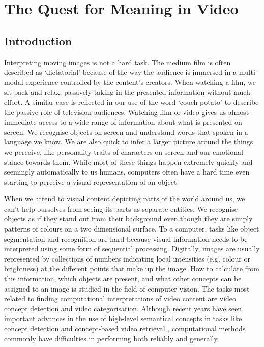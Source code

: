 \chapter{The Quest for Meaning in Video}
\label{ch:quest}

\section{Introduction} %
\label{sec:introduction}

Interpreting moving images is not a hard task. The medium film is often described as `dictatorial' because of the way the audience is immersed in a multi-modal experience controlled by the content's creators. When watching a film, we sit back and relax, passively taking in the presented information without much effort. A similar ease is reflected in our use of the word `couch potato' to describe the passive role of television audiences. Watching film or video gives us almost immediate access to a wide range of information about what is presented on screen. We recognise objects on screen and understand words that spoken in a language we know. We are also quick to infer a larger picture around the things we perceive, like personality traits of characters on screen and our emotional stance towards them. While most of these things happen extremely quickly and seemingly automatically to us humans, computers often have a hard time even starting to perceive a visual representation of an object.

When we attend to visual content depicting parts of the world around us, we can't help ourselves from seeing its parts as separate entities. We recognise objects as if they stand out from their background even though they are simply patterns of colours on a two dimensional surface. To a computer, tasks like object segmentation and recognition are hard because visual information needs to be interpreted using some form of sequential processing. Digitally, images are usually represented by collections of numbers indicating local intensities (e.g. colour or brightness) at the different points that make up the image. How to calculate from this information, which objects are present, and what other concepts can be assigned to an image is studied in the field of computer vision. The tasks most related to finding computational interpretations of video content are video concept detection and video categorisation. Although recent years have seen important advances in the use of high-level semantical concepts in tasks like concept detection and concept-based video retrieval \cite{Snoek:2009dq, Snoek:jf, Worring:2007vm, Chang:2008wh}, computational methods commonly have difficulties in performing both reliably and generally.

